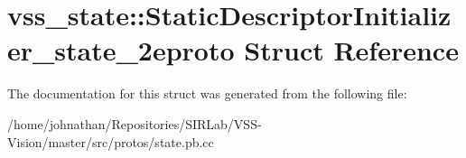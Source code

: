 \hypertarget{structvss__state_1_1StaticDescriptorInitializer__state__2eproto}{}\section{vss\+\_\+state\+:\+:Static\+Descriptor\+Initializer\+\_\+state\+\_\+2eproto Struct Reference}
\label{structvss__state_1_1StaticDescriptorInitializer__state__2eproto}


The documentation for this struct was generated from the following file\+:\begin{DoxyCompactItemize}
\item 
/home/johnathan/\+Repositories/\+S\+I\+R\+Lab/\+V\+S\+S-\/\+Vision/master/src/protos/state.\+pb.\+cc\end{DoxyCompactItemize}

